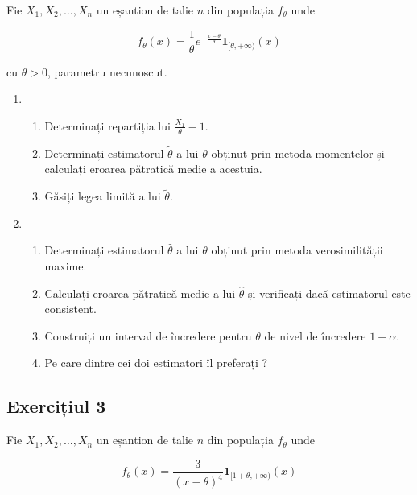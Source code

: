 \documentclass[]{article}
\begin{document}
Fie \(X_1, X_2, \ldots, X_n\) un eșantion de talie \(n\) din populația
\(f_{\theta}\) unde

\[
  f_{\theta}(x) = \frac{1}{\theta}e^{-\frac{x-\theta}{\theta}} \mathbf{1}_{[\theta, +\infty)}(x)
\]

cu \(\theta>0\), parametru necunoscut.

\begin{enumerate}
\def\labelenumi{\arabic{enumi}.}
\item
  \begin{enumerate}
  \def\labelenumii{\alph{enumii})}
  \item
    Determinați repartiția lui \(\frac{X_1}{\theta}-1\).
  \item
    Determinați estimatorul \(\tilde{\theta}\) a lui \(\theta\) obținut
    prin metoda momentelor și calculați eroarea pătratică medie a
    acestuia.
  \item
    Găsiți legea limită a lui \(\tilde{\theta}\).
  \end{enumerate}
\item
  \begin{enumerate}
  \def\labelenumii{\alph{enumii})}
  \item
    Determinați estimatorul \(\hat{\theta}\) a lui \(\theta\) obținut
    prin metoda verosimilității maxime.
  \item
    Calculați eroarea pătratică medie a lui \(\hat{\theta}\) și
    verificați dacă estimatorul este consistent.
  \item
    Construiți un interval de încredere pentru \(\theta\) de nivel de
    încredere \(1-\alpha\).
  \item
    Pe care dintre cei doi estimatori îl preferați ?
  \end{enumerate}
\end{enumerate}

\subsection{Exercițiul 3}\label{exercitiul-3}

Fie \(X_1, X_2, \ldots, X_n\) un eșantion de talie \(n\) din populația
\(f_{\theta}\) unde

\[
  f_{\theta}(x) = \frac{3}{(x-\theta)^4}\mathbf{1}_{[1+\theta,+\infty)}(x)
\]
\end{document}
